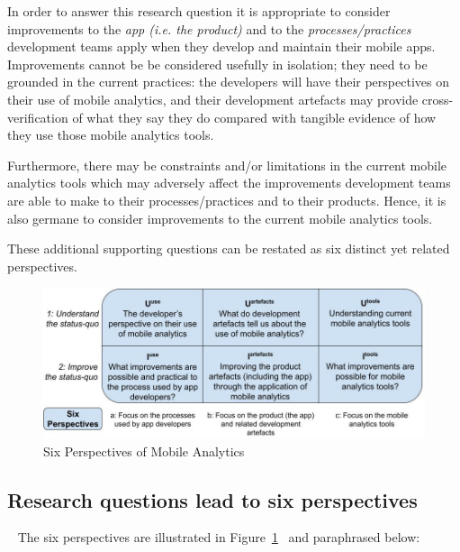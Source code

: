 In order to answer this research question it is appropriate to consider improvements to the \emph{app (i.e. the product)} and to the \emph{processes/practices} development teams apply when they develop and maintain their mobile apps. Improvements cannot be be considered usefully in isolation; they need to be grounded in the current practices: the developers will have their perspectives on their use of mobile analytics, and their development artefacts may provide cross-verification of what they say they do compared with tangible evidence of how they use those mobile analytics tools. 

Furthermore, there may be constraints and/or limitations in the current mobile analytics tools which may adversely affect the improvements development teams are able to make to their processes/practices and to their products. Hence, it is also germane to consider improvements to the current mobile analytics tools.

These additional supporting questions can be restated as six distinct yet related perspectives.

\begin{figure}
    \includegraphics[width=\linewidth]{images/my/six-perspectives-2x3-matrix-12-nov-2021.jpeg}
    \caption{Six Perspectives of Mobile Analytics}
    \label{fig:six-perspectives-in-the-research-questions-section}
\end{figure}

\subsection{Research questions lead to six perspectives}~\label{rq-leads-to-six-perspectives}
The six perspectives are illustrated in Figure~\ref{fig:six-perspectives-in-the-research-questions-section}~ and paraphrased below:

